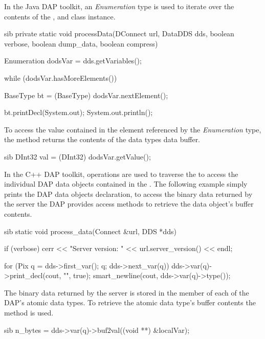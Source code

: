 \documentclass{dods-paper}
\begin{document}
In the Java DAP toolkit, an {\it Enumeration} type is used to iterate over 
the contents of the , and  class instance. 

\begin{vcode}{sib}
 private static void processData(DConnect url, DataDDS dds, boolean verbose,
                                  boolean dump_data, boolean compress) {

   Enumeration dodsVar = dds.getVariables();

   while (dodsVar.hasMoreElements()) {
      BaseType bt = (BaseType) dodsVar.nextElement();

      bt.printDecl(System.out);
      System.out.println();
   }
}
\end{vcode}

To access the value contained in the element referenced
by the {\it Enumeration} type, the  method
 returns the contents of the data types
data buffer.

\begin{vcode}{sib}
      DInt32 val = (DInt32) dodsVar.getValue();
\end{vcode}

In the C++ DAP toolkit,  operations are used to
traverse the  to access the individual DAP data objects 
contained in the .  The following example simply prints
the DAP data objects declaration, to access the binary data 
returned by the server the DAP provides access methods to retrieve
the data object's buffer contents.


\begin{vcode}{sib}
 static void
 process_data(Connect &url, DDS *dds)
 {
    if (verbose)
        cerr << "Server version: " << url.server_version() << endl;

    for (Pix q = dds->first_var(); q; dds->next_var(q)) {
        dds->var(q)->print_decl(cout, "", true);
        smart_newline(cout, dds->var(q)->type());
    }
 }
\end{vcode}

The binary data returned by the server is stored in the  member
of each of the DAP's atomic data types. To retrieve the atomic data 
type's buffer contents the  method  is used.

\begin{vcode}{sib}
  n_bytes = dds->var(q)->buf2val((void **) &localVar);
\end{vcode}
\end{document}
